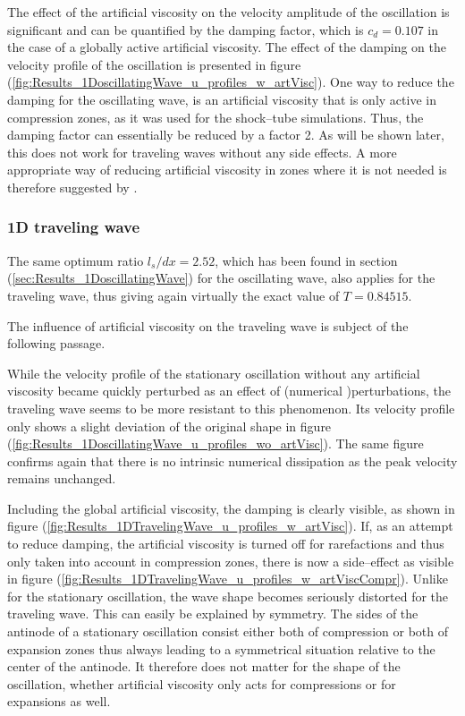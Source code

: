 \documentclass{report}
\begin{document}
The effect of the artificial viscosity on the velocity amplitude of the oscillation is significant and can be quantified by the damping factor, which is $c_d=0.107$ in the case of a globally active artificial viscosity. The effect of the damping on the velocity profile of the oscillation is presented in figure (\ref{fig:Results_1DoscillatingWave_u_profiles_w_artVisc}). One way to reduce the damping for the oscillating wave, is an artificial viscosity that is only active in compression zones, as it was used for the shock--tube simulations. Thus, the damping factor can essentially be reduced by a factor 2. As will be shown later, this does not work for traveling waves without any side effects. 
A more appropriate way of reducing artificial viscosity in zones where it is not needed is therefore suggested by \cite{Monaghan2005}.



\subsubsection{1D traveling wave}

The same optimum ratio $l_s/dx=2.52$, which has been found in section (\ref{sec:Results_1DoscillatingWave}) for the oscillating wave, also applies for the traveling wave, thus giving again virtually the exact value of $T=0.84515$. 

The influence of artificial viscosity on the traveling wave is subject of the following passage.

While the velocity profile of the stationary oscillation without any artificial viscosity became quickly perturbed as an effect of (numerical )perturbations, the traveling wave seems to be more resistant to this phenomenon. Its velocity profile only shows a slight deviation of the original shape in figure (\ref{fig:Results_1DoscillatingWave_u_profiles_wo_artVisc}). The same figure confirms again that there is no intrinsic numerical dissipation as the peak velocity remains unchanged.

Including the global artificial viscosity, the damping is clearly visible, as shown in figure (\ref{fig:Results_1DTravelingWave_u_profiles_w_artVisc}). If, as an attempt to reduce damping, the artificial viscosity is turned off for rarefactions and thus only taken into account in compression zones, there is now a side--effect as visible in figure (\ref{fig:Results_1DTravelingWave_u_profiles_w_artViscCompr}). Unlike for the stationary oscillation, the wave shape becomes seriously distorted for the traveling wave. This can easily be explained by symmetry. The sides of the antinode of a stationary oscillation consist either both of compression or both of expansion zones thus always leading to a symmetrical situation relative to the center of the antinode. It therefore does not matter for the shape of the oscillation, whether artificial viscosity only acts for compressions or for expansions as well.
\end{document}
